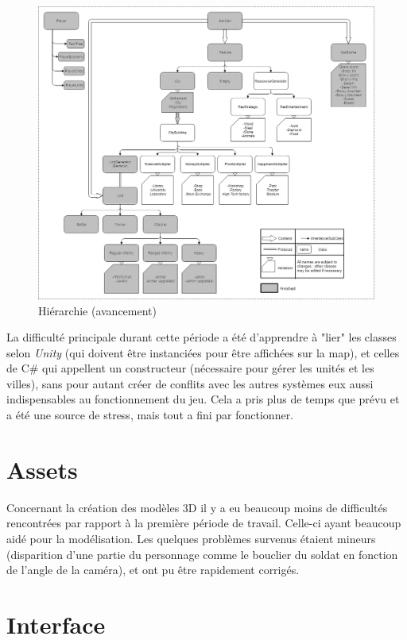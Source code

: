 \documentclass[12pt]{report}
\begin{document}
\begin{figure}[H]
    \centering
    \includegraphics[width=1\textwidth]{class_hierarchy}
    \caption{Hiérarchie (avancement)}
\end{figure}

La difficulté principale durant cette période a été d'apprendre à "lier" les
classes selon \textit{Unity} (qui doivent être instanciées pour être affichées
sur la map), et celles de C\# qui appellent un constructeur (nécessaire pour
gérer les unités et les villes), sans pour autant créer de conflits avec les
autres systèmes eux aussi indispensables au fonctionnement du jeu. Cela a pris
plus de temps que prévu et a été une source de stress, mais tout a fini par
fonctionner.

\section*{Assets}

Concernant la création des modèles 3D il y a eu beaucoup moins de difficultés
rencontrées par rapport à la première période de travail. Celle-ci ayant
beaucoup aidé pour la modélisation. Les quelques problèmes survenus étaient
mineurs (disparition d'une partie du personnage comme le bouclier du soldat en
fonction de l'angle de la caméra), et ont pu être rapidement corrigés.

\section*{Interface}
\end{document}

